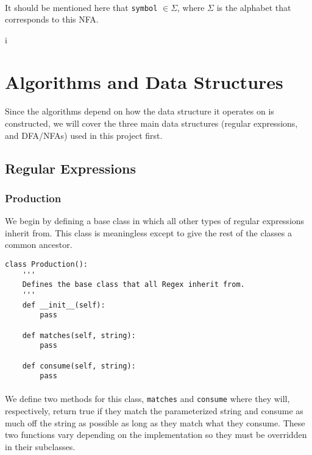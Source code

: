 \documentclass{article}
\begin{document}
\paragraph{} It should be mentioned here that \verb|symbol| $\in \Sigma$, 
where $\Sigma$ is the alphabet that corresponds to this NFA.

i\section{Algorithms and Data Structures}
\label{sec:algos}
\paragraph{} Since the algorithms depend on how the data structure it 
operates on is constructed, we will cover the three main data
structures (regular expressions, and DFA/NFAs) used in this project
first.

\subsection{Regular Expressions}
\label{sec:algos:regex}
\subsubsection{Production}
\label{sec:algos:regex:production}
We begin by defining a base class in which all other types of regular
expressions inherit from. This class is meaningless except to give
the rest of the classes a common ancestor.

\begin{verbatim}
class Production():
    '''
    Defines the base class that all Regex inherit from. 
    '''
    def __init__(self):
        pass

    def matches(self, string):
        pass

    def consume(self, string):
        pass
\end{verbatim}

\paragraph{} We define two methods for this class, \verb|matches| 
and \verb|consume| where they will, respectively, return true if they
match the parameterized string and consume as much off the string as
possible as long as they match what they consume. These two functions
vary depending on the implementation so they must be overridden in
their subclasses.
\end{document}

